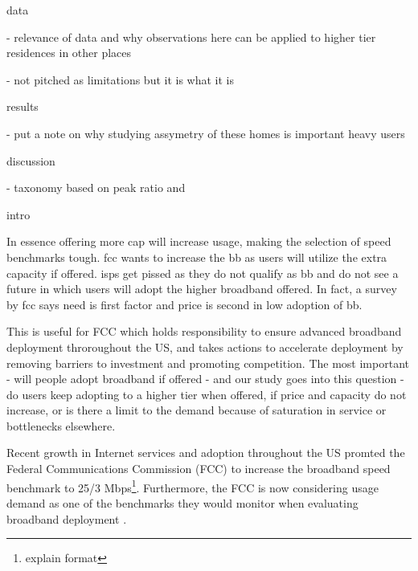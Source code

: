 data

- relevance of data and why observations here can be applied to higher tier residences in other places

- not pitched as limitations but it is what it is



results

- put a note on why studying assymetry of these homes is important heavy users


discussion

- taxonomy based on peak ratio and 


intro

In essence offering more cap will increase usage, making the selection of speed benchmarks tough. fcc wants to increase the bb as users will utilize the extra capacity if offered. isps get pissed as they do not qualify as bb and do not see a future in which users will adopt the higher broadband offered. In fact, a survey by fcc says need is first factor and price is second in low adoption of bb.

This is useful for FCC which holds responsibility to ensure advanced broadband deployment throroughout the US, and takes actions to accelerate deployment by removing barriers to investment and promoting competition. The most important - will people adopt broadband if offered - and our study goes into this question - do users keep adopting to a higher tier when offered, if price and capacity do not increase, or is there a limit to the demand because of saturation in service or bottlenecks elsewhere.

Recent growth in Internet services and adoption throughout the US promted the Federal Communications Commission (FCC) to increase the broadband speed benchmark to 25/3 Mbps\footnote{explain format}. Furthermore, the FCC is now considering usage demand as one of the benchmarks they would monitor when evaluating broadband deployment \cite{fcc2015broadband-report}.